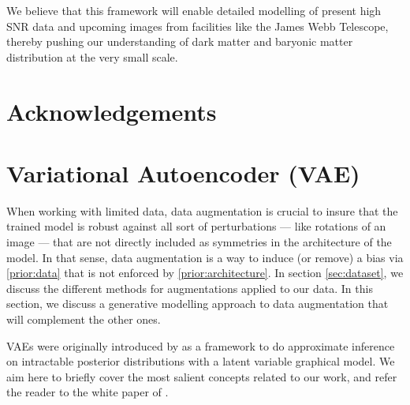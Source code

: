 \documentclass[twocolumn]{aastex631}
\begin{document}
We believe that this framework will enable detailed modelling of present high SNR data and 
upcoming images from facilities like the James Webb Telescope, thereby pushing our understanding of 
dark matter and baryonic matter distribution at the very small scale.


\section{Acknowledgements}


\appendix


\section{Variational Autoencoder (VAE)}\label{ap:VAE}
When working with limited data, data augmentation is crucial to insure that 
the trained model is robust against all sort of perturbations ---
like rotations of an image --- that are not directly included as symmetries in the 
architecture of the model. In that sense, data augmentation is a way to 
induce (or remove) 
a bias via \ref{prior:data} that is not enforced by \ref{prior:architecture}.
In section 
\ref{sec:dataset}, we discuss the different methods for 
augmentations applied to our data. 
In this section, we discuss a generative modelling approach 
to data augmentation that will complement the other ones.

VAEs were originally introduced by \citet{Kingma2013} as a framework to do approximate inference on 
intractable posterior distributions with a latent variable graphical model. 
We aim here to briefly 
cover the most salient concepts related to our work, and refer
the reader to the white paper of \citet{Kingma2019}.
\end{document}
